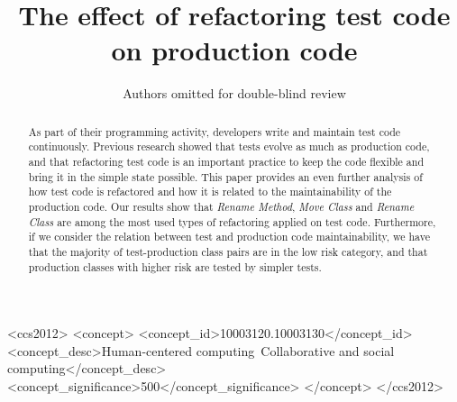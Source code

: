 \documentclass[sigconf,review,anonymous]{acmart}
\begin{document}
\title{The effect of refactoring test code on production code}
\author{Authors omitted for double-blind review}
\orcid{}

\newcommand{\ie}{\emph{i.e.},~}
\newcommand{\eg}{\emph{e.g.},~}
\newcommand{\etc}{\emph{etc.}~}
\newcommand{\etal}{\emph{et al.}~}

\begin{abstract}
As part of their programming activity, developers write and maintain test code continuously. Previous research showed that
tests evolve as much as production code, and that refactoring test code is an important practice to keep the code flexible and
bring it in the simple state possible. 
This paper provides an even further analysis of how test code is refactored and how it is related to the maintainability of the production code. Our results show that \emph{Rename Method}, \emph{Move Class} and \emph{Rename Class} are among the most used types of refactoring applied on test code. Furthermore, if we consider the relation between test and production code maintainability, we have that the majority of test-production class pairs are in the low risk category, and that production classes with higher risk are tested by simpler tests.
\end{abstract}
\begin{CCSXML}
<ccs2012>
<concept>
<concept_id>10003120.10003130</concept_id>
<concept_desc>Human-centered computing~Collaborative and social computing</concept_desc>
<concept_significance>500</concept_significance>
</concept>
</ccs2012>
\end{CCSXML}
\maketitle


% 

% 


% 



\end{document}
